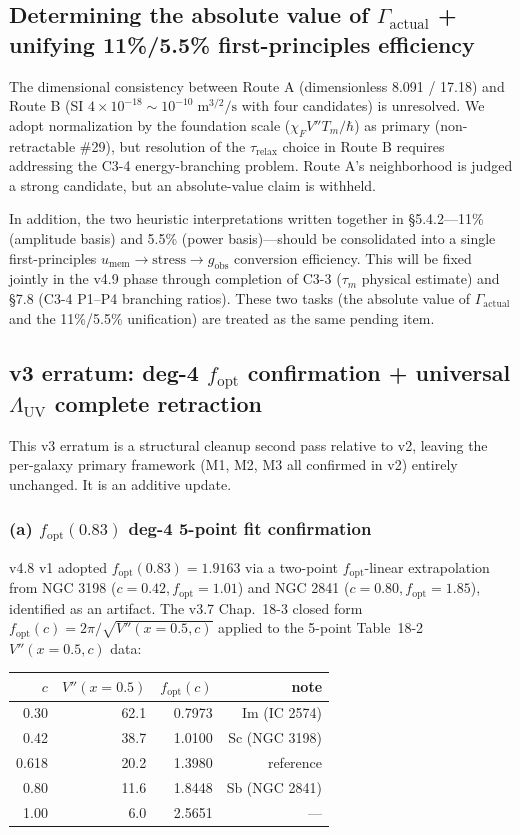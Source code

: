 \documentclass[11pt,a4paper]{article}
\newcommand{\Tm}{T_{m}}
\newcommand{\taum}{\tau_{m}}
\newcommand{\taur}{\tau_{\mathrm{relax}}}
\newcommand{\umem}{u_{\mathrm{mem}}}
\newcommand{\Lambdauv}{\Lambda_{\mathrm{UV}}}
\newcommand{\Gammaact}{\Gamma_{\mathrm{actual}}}
\newcommand{\gobs}{g_{\mathrm{obs}}}
\newcommand{\fopt}{f_{\mathrm{opt}}}
\begin{document}
\subsection{Determining the absolute value of $\Gammaact$ + unifying 11\%/5.5\% first-principles efficiency}
The dimensional consistency between Route A (dimensionless 8.091 / 17.18) and Route B (SI
$4 \times 10^{-18}\sim 10^{-10}\;\mathrm{m}^{3/2}/\mathrm{s}$ with four candidates) is unresolved.
We adopt normalization by the foundation scale ($\chi_F V'' \Tm / \hbar$) as primary
(non-retractable \#29), but resolution of the $\taur$ choice in Route B requires addressing the
C3-4 energy-branching problem. Route A's neighborhood is judged a strong candidate, but an
absolute-value claim is withheld.

In addition, the two heuristic interpretations written together in \S 5.4.2---11\% (amplitude basis)
and 5.5\% (power basis)---should be consolidated into a single first-principles
$\umem \to \text{stress} \to \gobs$ conversion efficiency. This will be fixed jointly in the v4.9
phase through completion of C3-3 ($\taum$ physical estimate) and \S 7.8 (C3-4 P1--P4 branching
ratios). These two tasks (the absolute value of $\Gammaact$ and the 11\%/5.5\% unification) are
treated as the same pending item.

\subsection{v3 erratum: deg-4 $\fopt$ confirmation + universal $\Lambdauv$ complete retraction}
This v3 erratum is a structural cleanup second pass relative to v2, leaving the per-galaxy
primary framework (M1, M2, M3 all confirmed in v2) entirely unchanged. It is an additive update.

\subsubsection*{(a) $\fopt(0.83)$ deg-4 5-point fit confirmation}

v4.8 v1 adopted $\fopt(0.83) = 1.9163$ via a two-point $\fopt$-linear extrapolation from
NGC 3198 ($c=0.42, \fopt=1.01$) and NGC 2841 ($c=0.80, \fopt=1.85$), identified as an artifact.
The v3.7 Chap.~18-3 closed form $\fopt(c) = 2\pi/\sqrt{V''(x=0.5, c)}$ applied to the 5-point
Table~18-2 $V''(x=0.5, c)$ data:

\begin{center}\small
\begin{tabular}{@{}rrrr@{}}
\toprule
$c$ & $V''(x=0.5)$ & $\fopt(c)$ & note \\
\midrule
0.30  & 62.1 & 0.7973 & Im (IC 2574) \\
0.42  & 38.7 & 1.0100 & Sc (NGC 3198) \\
0.618 & 20.2 & 1.3980 & reference \\
0.80  & 11.6 & 1.8448 & Sb (NGC 2841) \\
1.00  &  6.0 & 2.5651 & --- \\
\bottomrule
\end{tabular}
\end{center}
\end{document}

